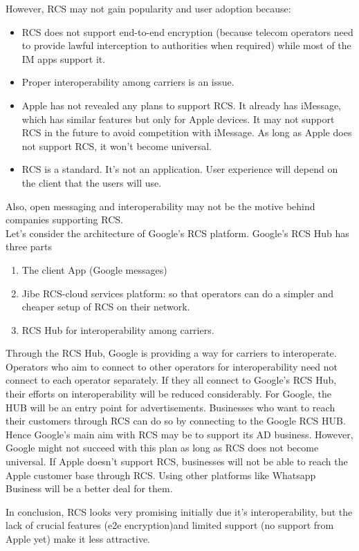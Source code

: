 \documentclass[11pt, conference, a4paper]{IEEEtran}
\begin{document}
However, RCS may not gain popularity and user adoption because:
\begin{itemize}
\item RCS does not support end-to-end encryption (because telecom operators need to provide lawful interception to authorities when required) while most of the IM apps support it.
\item Proper interoperability among carriers is an issue.
\item Apple has not revealed any plans to support RCS. It already has iMessage, which has similar features but only for Apple devices. It may not support RCS in the future to avoid competition with iMessage. As long as Apple does not support RCS, it won't become universal.
\item RCS is a standard. It's not an application. User experience will depend on the client that the users will use.
\end{itemize}
Also, open messaging and interoperability may not be the motive behind companies supporting RCS. \cite{rcs-google} \\
Let's consider the architecture of Google's RCS platform.
Google's RCS Hub has three parts
\begin{enumerate}
\item The client App (Google messages)
\item Jibe RCS-cloud services platform: so that operators can do a simpler and cheaper setup of RCS on their network.
\item RCS Hub for interoperability among carriers.
\end{enumerate}
Through the RCS Hub, Google is providing a way for carriers to interoperate. Operators who aim to connect to other operators for interoperability need not connect to each operator separately. If they all connect to Google's RCS Hub, their efforts on interoperability will be reduced considerably.
For Google, the HUB will be an entry point for advertisements. Businesses who want to reach their customers through RCS can do so by connecting to the Google RCS HUB. \\
Hence Google's main aim with RCS may be to support its AD business. 
However, Google might not succeed with this plan as long as RCS does not become universal. If Apple doesn’t support RCS, businesses will not be able to reach the Apple customer base through RCS. Using other platforms like Whatsapp Business will be a better deal for them. 
\par
In conclusion, RCS looks very promising initially due it's interoperability, but the lack of crucial features (e2e encryption)and limited support (no support from Apple yet) make it less attractive.
\end{document}
